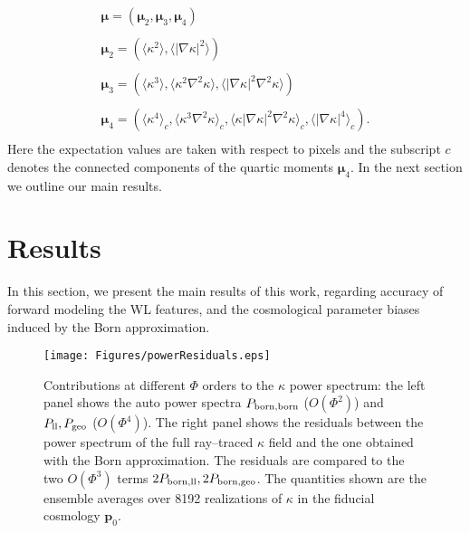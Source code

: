 \documentclass[reprint,aps,prd,superscriptaddress,showkeys,showpacs]{revtex4-1}
\newcommand{\bb}[1]{\mathbf{#1}}
\begin{document}
\begin{equation}
\label{par:moments}
\begin{matrix}
\pmb{\mu} = (\pmb{\mu}_2,\pmb{\mu}_3,\pmb{\mu}_4) \\ \\
\pmb{\mu}_2 = \left(\langle\kappa^2\rangle,\langle\vert\nabla\kappa\vert^2\rangle\right) \\ \\
\pmb{\mu}_3 = \left(\langle\kappa^3\rangle,\langle\kappa^2\nabla^2\kappa\rangle,\langle\vert\nabla\kappa\vert^2\nabla^2\kappa\rangle\right) \\ \\
\pmb{\mu}_4 = \left(\langle\kappa^4\rangle_c,\langle\kappa^3\nabla^2\kappa\rangle_c,\langle\kappa\vert\nabla\kappa\vert^2\nabla^2\kappa\rangle_c,\langle\vert\nabla\kappa\vert^4\rangle_c\right).\\
\end{matrix}
\end{equation} 
%
Here the expectation values are taken with respect to pixels and the subscript $c$ denotes the connected components of the quartic moments $\pmb{\mu}_4$. In the next section we outline our main results.  


\section{Results}
\label{sec:results}
% 
In this section, we present the main results of this work, regarding  accuracy of forward modeling the WL features, and the cosmological parameter biases induced by the Born approximation.

\begin{figure*}
\begin{center}
\texttt{[image: Figures/powerResiduals.eps]}
\end{center}
\caption{Contributions at different $\Phi$ orders to the $\kappa$ power spectrum: the left panel shows the auto power spectra $P_{\rm born,born}$ ($O(\Phi^2)$) and $P_{\rm ll},P_{\rm geo}$ ($O(\Phi^4)$). The right panel shows the residuals between the power spectrum of the full ray--traced $\kappa$ field and the one obtained with the Born approximation. The residuals are compared to the two $O(\Phi^3)$ terms $2P_{\rm born,ll},2P_{\rm born,geo}$. The quantities shown are the ensemble averages over 8192 realizations of $\kappa$ in the fiducial cosmology $\bb{p}_0$.}
\label{fig:psResiduals}
\end{figure*}
\end{document}
